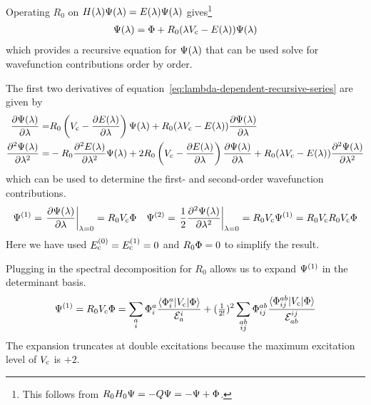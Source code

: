 \documentclass[11pt]{article}
\numberwithin{equation}{section}
\begin{document}
\begin{samepage}
\begin{rmk}
Operating $R_0$ on $H(\lambda )\Psi (\lambda )=E(\lambda )\Psi (\lambda )$ gives\footnote{This follows from $R_0H_0\Psi =-Q\Psi =-\Psi +\Phi $.}
\begin{align}
\label{eq:lambda-dependent-recursive-series}
  \Psi (\lambda )
=
  \Phi 
+
  R_0
  (
    \lambda  V_{\mathrm{c}}
  -
    E(\lambda )
  )
  \Psi (\lambda )
\end{align}
which provides a recursive equation for $\Psi (\lambda )$ that can be used solve for wavefunction contributions order by order.
\end{rmk}
\end{samepage}

\begin{ex}
The first two derivatives of equation~\ref{eq:lambda-dependent-recursive-series} are given by
\begin{align*}
  \frac {\partial\Psi (\lambda )}{\partial\lambda }
=&
  R_0
  \left(
    V_{\mathrm{c}}
  -
    \frac {\partial E(\lambda )}{\partial\lambda }
  \right)
  \Psi (\lambda )
+
  R_0
  (
    \lambda  V_{\mathrm{c}}
  -
    E(\lambda )
  )
  \frac {\partial\Psi (\lambda )}{\partial\lambda }
\\
  \frac {\partial^2\Psi (\lambda )}{\partial\lambda ^2}
=&
-
  R_0
  \frac {\partial^2E(\lambda )}{\partial\lambda ^2}
  \Psi (\lambda )
+
  2
  R_0
  \left(
    V_{\mathrm{c}}
  -
    \frac {\partial E(\lambda )}{\partial\lambda }
  \right)
  \frac {\partial\Psi (\lambda )}{\partial\lambda }
+
  R_0
  (
    \lambda  V_{\mathrm{c}}
  -
    E(\lambda )
  )
  \frac {\partial^2\Psi (\lambda )}{\partial\lambda ^2}
\end{align*}
which can be used to determine the first- and second-order wavefunction contributions.
\begin{align*}
  \Psi ^{(1)}
=
  \left.
  \frac {\partial\Psi (\lambda )}{\partial\lambda }
  \right|_{\lambda =0}
=
  R_0
  V_{\mathrm{c}}
  \Phi 
&&
  \Psi ^{(2)}
=
  \left.
  \frac {1}{2}
  \frac {\partial^2\Psi (\lambda )}{\partial\lambda ^2}
  \right|_{\lambda =0}
=
  R_0
  V_{\mathrm{c}}
  \Psi ^{(1)}
=
  R_0
  V_{\mathrm{c}}
  R_0
  V_{\mathrm{c}}
  \Phi 
\end{align*}
Here we have used $E_{\mathrm{c}}^{(0)}=E_{\mathrm{c}}^{(1)}=0$ and $R_0\Phi =0$ to simplify the result.
\end{ex}

\begin{ex}
\label{ex:first-order-wavefunction-expansion-unsimplified}
Plugging in the spectral decomposition for $R_0$ allows us to expand $\Psi ^{(1)}$ in the determinant basis.
\begin{align}
\label{eq:first-order-wavefunction-expansion-unsimplified}
  \Psi ^{(1)}
=
  R_0
  V_{\mathrm{c}}
  \Phi 
=
  \sum_{\substack{a\\i}}
  \Phi _i^a
  \frac {\langle\Phi _i^a|V_{\mathrm{c}}|\Phi \rangle}{\mathcal{E}_a^i}
+
  (\tfrac{1}{2!})^2
  \sum_{\substack{ab\\ij}}
  \Phi _{ij}^{ab}
  \frac {\langle\Phi _{ij}^{ab}|V_{\mathrm{c}}|\Phi \rangle}{\mathcal{E}_{ab}^{ij}}
\end{align}
The expansion truncates at double excitations because the maximum excitation level of $V_{\mathrm{c}}$ is $+2$.
\end{ex}
\end{document}
